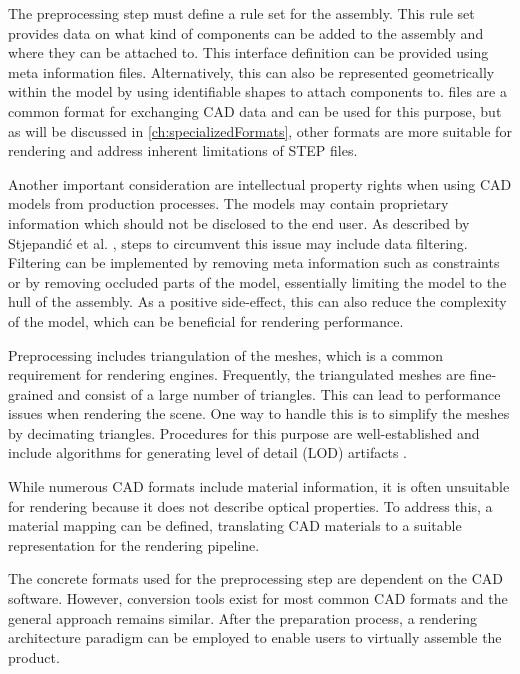 The preprocessing step must define a rule set for the assembly. This rule set provides data on what kind of components can be added to the assembly and where they can be attached to. This interface definition can be provided using meta information files. Alternatively, this can also be represented geometrically within the model by using identifiable shapes to attach components to.  files are a common format for exchanging \gls{CAD} data and can be used for this purpose, but as will be discussed in \autoref{ch:specializedFormats}, other formats are more suitable for rendering and address inherent limitations of \gls{STEP} files.

Another important consideration are intellectual property rights when using \gls{CAD} models from production processes. The models may contain proprietary information which should not be disclosed to the end user. As described by Stjepandić et al. \cite{ipr}, steps to circumvent this issue may include data filtering. Filtering can be implemented by removing meta information such as constraints or by removing occluded parts of the model, essentially limiting the model to the hull of the assembly. As a positive side-effect, this can also reduce the complexity of the model, which can be beneficial for rendering performance.

Preprocessing includes triangulation of the meshes, which is a common requirement for rendering engines. Frequently, the triangulated meshes are fine-grained and consist of a large number of triangles. This can lead to performance issues when rendering the scene. One way to handle this is to simplify the meshes by decimating triangles. Procedures for this purpose are well-established and include algorithms for generating level of detail (\gls{LOD}) artifacts \cite{luebke2003level}.

While numerous \gls{CAD} formats include material information, it is often unsuitable for rendering because it does not describe optical properties. To address this, a material mapping can be defined, translating \gls{CAD} materials to a suitable representation for the rendering pipeline.

The concrete formats used for the preprocessing step are dependent on the \gls{CAD} software. However, conversion tools exist for most common \gls{CAD} formats and the general approach remains similar. After the preparation process, a rendering architecture paradigm can be employed to enable users to virtually assemble the product.

